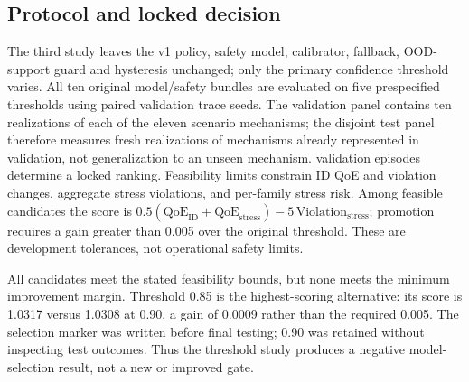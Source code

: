 \documentclass[10pt]{article}
\providecommand{\thresholdpath}{generated-threshold}
\begin{document}
\subsection{Protocol and locked decision}
The third study leaves the v1 policy, safety model, calibrator, fallback, OOD-support guard and hysteresis unchanged; only the primary confidence threshold varies. All ten original model/safety bundles are evaluated on five prespecified thresholds using paired validation trace seeds. The validation panel contains ten realizations of each of the eleven scenario mechanisms; the disjoint test panel therefore measures fresh realizations of mechanisms already represented in validation, not generalization to an unseen mechanism. \ThresholdValidationEpisodes{} validation episodes determine a locked ranking. Feasibility limits constrain ID QoE and violation changes, aggregate stress violations, and per-family stress risk. Among feasible candidates the score is \(0.5(\mathrm{QoE}_{\mathrm{ID}}+\mathrm{QoE}_{\mathrm{stress}})-5\,\mathrm{Violation}_{\mathrm{stress}}\); promotion requires a gain greater than 0.005 over the original \ThresholdThreshold{} threshold. These are development tolerances, not operational safety limits.

\begin{table}[H]
\centering\resizebox{\textwidth}{!}{}
\caption{Frozen v3 validation ranking. The 0.90 baseline is retained unless a feasible candidate exceeds its score by more than 0.005. All five candidates were feasible; 0.85 had the largest alternative score gain (0.0009), so the predeclared margin was not met. Values are validation-panel means.}
\label{tab:thresholds}
\end{table}

All candidates meet the stated feasibility bounds, but none meets the minimum improvement margin. Threshold 0.85 is the highest-scoring alternative: its score is 1.0317 versus 1.0308 at 0.90, a gain of 0.0009 rather than the required 0.005. The selection marker was written before final testing; 0.90 was retained without inspecting test outcomes. Thus the threshold study produces a negative model-selection result, not a new or improved gate.
\end{document}
